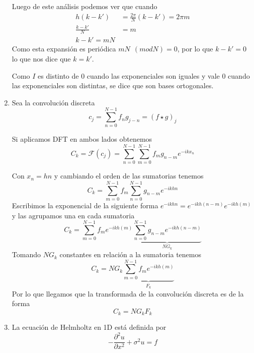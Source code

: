 \documentclass[spanish]{article}
\begin{document}
\begin{enumerate}
  Luego de este análisis podemos ver que cuando 
  \begin{align}
      h(k-k') &= \frac{2 \pi}{N} (k -k') = 2 \pi m \\ 
      \frac{k-k'}{N} &= m \\
      k - k' = mN
  \end{align}
  Como esta expansión es periódica $mN \ \  (mod N) = 0$, por lo que $k - k' = 0$ lo que nos dice que $k = k'$.
  
  Como $I$ es distinto de 0 cuando las exponenciales son iguales y vale 0 cuando las exponenciales son distintas, se dice que son bases ortogonales.
  
  
  \item  Sea la convolución discreta 
    \begin{equation}
        c_j = \displaystyle \sum_{n=0}^{N-1} f_n g_{j-n} = (f \star g)_j
    \end{equation}
    
    Si aplicamos DFT en ambos lados obtenemos
    \begin{equation}
        C_k = \mathcal{F}(c_j) =  \displaystyle \sum_{n=0}^{N-1} \displaystyle \sum_{m=0}^{N-1} f_m g_{n-m} e^{- i k x_n}
    \end{equation}
    
    Con $x_n = hn$ y cambiando el orden de las sumatorias tenemos
    \begin{equation}
        C_k =  \displaystyle \sum_{m=0}^{N-1} f_m \displaystyle \sum_{n=0}^{N-1} g_{n-m} e^{- i k hn} 
    \end{equation}
    Escribimos la exponencial de la siguiente forma $e^{- i k hn}= e^{- i k h(n-m)}e^{- i k h(m)}$ y las agrupamos una en cada sumatoria
    \begin{equation}
        C_k =  \displaystyle \sum_{m=0}^{N-1} f_m e^{- i k h(m)} \displaystyle \underbrace{\sum_{n=0}^{N-1} g_{n-m} e^{- i k h(n-m)}}_{NG_k}
    \end{equation}
    Tomando $N G_k$ constantes en relación a la sumatoria tenemos
     \begin{equation}
        C_k = NG_k \underbrace{\displaystyle \sum_{m=0}^{N-1} f_m e^{- i k h(m)}}_{F_k}
    \end{equation}
    Por lo que llegamos que la transformada de la convolución discreta es de la forma
    \begin{equation}
        C_k = NG_k F_k
    \end{equation}
    
    
    \item La ecuación de Helmholtz en 1D está definida por
    \begin{equation}
        -\frac{\partial^2 u}{\partial x^2} + \sigma^2 u = f
    \end{equation}
    

\end{enumerate}
\end{document}
